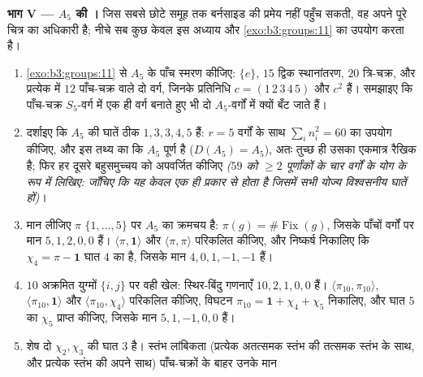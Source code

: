 \begin{problem}[{सप्ताहांत समस्या --- क्रम $p^aq^b$ के समूहों की
विलेयता}]
\medskip
\noindent\textbf{भाग V --- $A_5$ की ।} जिस सबसे छोटे
समूह तक बर्नसाइड की प्रमेय नहीं पहुँच सकती, वह अपने पूरे चित्र का
अधिकारी है; नीचे सब कुछ केवल इस अध्याय और \cref{exo:b3:groups:11} का उपयोग करता
है।
\begin{enumerate}[resume]
  \item \cref{exo:b3:groups:11} से $A_5$ के पाँच  स्मरण कीजिए: $\{e\}$,
        $15$ द्विक स्थानांतरण, $20$ त्रि-चक्र, और प्रत्येक में $12$
        पाँच-चक्र वाले दो वर्ग, जिनके प्रतिनिधि $c =
        (1\,2\,3\,4\,5)$ और $c^2$
        हैं। समझाइए कि पाँच-चक्र $S_5$-वर्ग में एक ही वर्ग बनाते
        हुए भी दो $A_5$-वर्गों में क्यों बँट जाते हैं।
  \item दर्शाइए कि $A_5$ की  घातें ठीक $1, 3, 3, 4, 5$ हैं: $r = 5$
        वर्गों के साथ $\sum_in_i^2 = 60$ का उपयोग कीजिए, और इस तथ्य का कि
        $A_5$ पूर्ण है ($D(A_5) =
        A_5$), अतः तुच्छ  ही उसका एकमात्र
        रैखिक  है; फिर हर दूसरे बहुसमुच्चय को अपवर्जित कीजिए
        \emph{($59$ को $\geq 2$ पूर्णांकों के चार वर्गों के योग के
        रूप में लिखिए: जाँचिए कि यह केवल एक ही प्रकार से होता है
        जिसमें सभी योज्य विश्वसनीय घातें हों)}।
  \item मान लीजिए $\pi$ $\{1, \dots, 5\}$ पर $A_5$ का क्रमचय  है:
        $\pi(g) = \#\operatorname{Fix}(g)$, जिसके पाँचों वर्गों पर मान $5, 1, 2, 0, 0$ हैं। $\langle\pi, \mathbf 1\rangle$ और
        $\langle\pi,
        \pi\rangle$ परिकलित कीजिए, और निष्कर्ष निकालिए कि $\chi_4 = \pi - \mathbf 1$ घात
        $4$ का  है, जिसके मान $4, 0, 1, -1,
        -1$ हैं।
  \item $10$ अक्रमित युग्मों $\{i, j\}$ पर वही खेल: स्थिर-बिंदु
        गणनाएँ $10, 2, 1, 0, 0$ हैं। $\langle\pi_{10}, \pi_{10}\rangle$, $\langle\pi_{10},
        \mathbf 1\rangle$ और $\langle\pi_{10}, \chi_4\rangle$ परिकलित कीजिए,
        विघटन $\pi_{10} = \mathbf 1 + \chi_4
        + \chi_5$ निकालिए, और घात $5$ का  $\chi_5$
        प्राप्त कीजिए, जिसके मान $5, 1, -1, 0, 0$ हैं।
  \item शेष दो  $\chi_2, \chi_3$ की घात $3$ है। स्तंभ लांबिकता
        (प्रत्येक अतत्समक स्तंभ की तत्समक स्तंभ के साथ, और
        प्रत्येक स्तंभ की अपने साथ) पाँच-चक्रों के बाहर उनके मान

\end{enumerate}
\end{problem}
